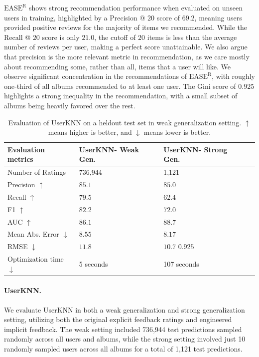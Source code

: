 \documentclass{article}
\newcommand{\easer}{$\text{EASE}^\text{R}$\xspace}
\newcommand{\userknn}{UserKNN\xspace}
\begin{document}
\easer shows strong recommendation performance when evaluated on unseen users
in training, highlighted by a Precision @ $20$ score of $69.2$, meaning users
provided
positive reviews for the majority of items we recommended.
While the Recall @ $20$ score is only $21.0$, the cutoff of 20 items is less than the
 average number of reviews per user, making a perfect score unattainable.
We also argue that precision is the more relevant metric in
 recommendation, as we care mostly about recommending some, rather than
 all, items that a user will like.
We observe significant concentration in the recommendations of \easer, with
 roughly one-third of all albums recommended to at least one user.
The Gini score of $0.925$ highlights a strong inequality in the recommendation,
 with a small subset of albums being heavily favored over the rest.

\begin{table}[h]
\centering
\begin{tabular}{@{}llll@{}}
\toprule
Evaluation metrics    & \userknn - Weak Gen. & \userknn -
Strong Gen.
\\ \midrule
Number of Ratings			  & 736,944
& 1,121 \\
Precision $\uparrow$	      & $85.1$		     & $85.0$
\\
Recall	$\uparrow$		& $79.5$	       & $62.4$
\\
F1	$\uparrow$		    & $82.2$		   &
$72.0$
\\
AUC $\uparrow$					& $86.1$
& $88.7$
\\
Mean Abs.
Error $\downarrow$	   & $8.55$		& $8.17$ \\ RMSE $\downarrow$ &
 $11.8$ &$10.7$ $0.925$ \\ Optimization time $\downarrow$ & 5 seconds & 107
 seconds \\ \bottomrule \end{tabular} \caption{Evaluation of \userknn on a
 heldout test set in weak generalization setting.
$\uparrow$ means
higher is better, and $\downarrow$
means lower is better.}
\label{tab:userknn-results}

\end{table}

\paragraph*{\userknn.}
We evaluate \userknn in both a weak generalization and strong generalization
 setting, utilizing both the original explicit feedback ratings and engineered
 implicit feedback.
The weak setting included 736,944 test predictions sampled
 randomly across all users and albums, while the strong setting involved just 10
 randomly sampled users across all albums for a total of 1,121 test predictions.
\end{document}
